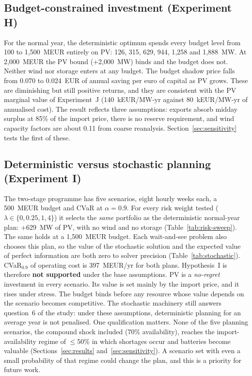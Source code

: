 \subsection{Budget-constrained investment (Experiment H)}
For the normal year, the deterministic optimum spends every budget level from 100 to 1{,}500~MEUR entirely on
PV: 126, 315, 629, 944, 1{,}258 and 1{,}888~MW. At 2{,}000~MEUR the PV bound (+2{,}000~MW) binds and the
budget does not. Neither wind nor storage enters at any budget. The budget shadow price falls from 0.070 to
0.024~EUR of annual saving per euro of capital as PV grows. These are diminishing but still positive returns,
and they are consistent with the PV marginal value of Experiment~J (140~kEUR/MW-yr against 80~kEUR/MW-yr of
annualised cost). The result reflects three assumptions: exports absorb midday surplus at 85\% of the import
price, there is no reserve requirement, and wind capacity factors are about 0.11 from coarse reanalysis.
Section~\ref{sec:sensitivity} tests the first of these.

\subsection{Deterministic versus stochastic planning (Experiment I)}
The two-stage programme has five scenarios, eight hourly weeks each, a 500~MEUR budget and CVaR at $\alpha=0.9$.
For every risk weight tested ($\lambda\in\{0,0.25,1,4\}$) it selects the \emph{same} portfolio as the
deterministic normal-year plan: +629~MW of PV, with no wind and no storage (Table~\ref{tab:risk-sweep}). The same
holds at a 1{,}500~MEUR budget. Each wait-and-see problem also chooses this plan, so the value of the stochastic
solution and the expected value of perfect information are both zero to solver precision
(Table~\ref{tab:stochastic}). CVaR$_{0.9}$ of operating cost is 397~MEUR/yr for both plans. Hypothesis~I is
therefore \textbf{not supported} under the base assumptions. PV is a \emph{no-regret} investment in every
scenario. Its value is set mainly by the import price, and it rises under stress. The budget binds before any
resource whose value depends on the scenario becomes competitive. The stochastic machinery still answers
question~6 of the study: under these assumptions, deterministic planning for an average year is not
penalised. One qualification matters. None of the five planning scenarios, the compound shock included
(70\% availability), reaches the import-availability regime of $\le$50\% in which shortages occur and
batteries become valuable (Sections~\ref{sec:results} and~\ref{sec:sensitivity}). A scenario set with even a
small probability of that regime could change the plan, and this is a priority for future work.

